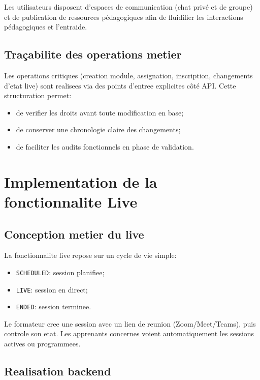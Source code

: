 \documentclass[12pt,a4paper,oneside]{report}
\begin{document}
Les utilisateurs disposent d'espaces de communication (chat privé et de groupe) et de publication de ressources pédagogiques afin de fluidifier les interactions pédagogiques et l'entraide.

\subsection{Traçabilite des operations metier}

Les operations critiques (creation module, assignation, inscription, changements d'etat live) sont realisees via des points d'entree explicites côté API. Cette structuration permet:
\begin{itemize}
  \item de verifier les droits avant toute modification en base;
  \item de conserver une chronologie claire des changements;
  \item de faciliter les audits fonctionnels en phase de validation.
\end{itemize}

\section{Implementation de la fonctionnalite Live}

\subsection{Conception metier du live}

La fonctionnalite live repose sur un cycle de vie simple:
\begin{itemize}
  \item \texttt{SCHEDULED}: session planifiee;
  \item \texttt{LIVE}: session en direct;
  \item \texttt{ENDED}: session terminee.
\end{itemize}

Le formateur cree une session avec un lien de reunion (Zoom/Meet/Teams), puis controle son etat. Les apprenants concernes voient automatiquement les sessions actives ou programmees.

\subsection{Realisation backend}
\end{document}

